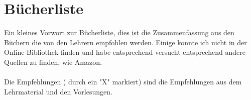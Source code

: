 \section{Bücherliste}

Ein kleines Vorwort zur Bücherliste, dies ist die Zusammenfassung aus den Büchern die von den Lehrern empfohlen werden. Einige konnte ich nicht in der Online-Bibliothek finden und habe entsprechend versucht entsprechend andere Quellen zu finden, wie Amazon. \\~\\
Die Empfehlungen ( durch ein "X" markiert) sind die Empfehlungen aus dem Lehrmaterial und den Vorlesungen.

